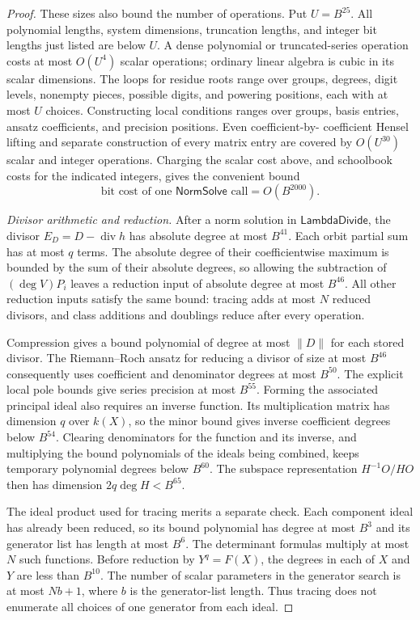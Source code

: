 \begin{proof}
These sizes also bound the number of operations.  Put $U=B^{25}$.
All polynomial lengths, system dimensions, truncation lengths, and
integer bit lengths just listed are below $U$.  A dense polynomial or
truncated-series operation costs at most $O(U^4)$ scalar operations;
ordinary linear algebra is cubic in its scalar dimensions.  The loops
for residue roots range over groups, degrees, digit levels, nonempty
pieces, possible digits, and powering positions, each with at most $U$
choices.  Constructing local conditions ranges over groups, basis entries,
ansatz coefficients, and precision positions.  Even coefficient-by-
coefficient Hensel lifting and separate construction of every matrix
entry are covered by $O(U^{30})$ scalar and integer operations.
Charging the scalar cost above, and schoolbook costs for the indicated
integers, gives the convenient bound
\begin{equation}
 \text{bit cost of one }\mathsf{NormSolve}\text{ call}=O(B^{2000}).
 \label{complexity:norm}
\end{equation}

\smallskip
\noindent\emph{Divisor arithmetic and reduction.}
After a norm solution in $\mathsf{LambdaDivide}$, the divisor
$E_D=D-\operatorname{div}h$ has absolute degree at most $B^{41}$.
Each orbit partial sum has at most $q$ terms.  The absolute degree of
their coefficientwise maximum is bounded by the sum of their absolute
degrees, so allowing the subtraction of $(\deg V)P_i$ leaves a reduction
input of absolute degree at most $B^{46}$.
All other reduction inputs satisfy the same bound: tracing adds at most
$N$ reduced divisors, and class additions and doublings reduce after
every operation.

Compression gives a bound polynomial of degree at most $\|D\|$ for
each stored divisor.  The Riemann--Roch ansatz for reducing a divisor
of size at most $B^{46}$ consequently uses coefficient and denominator
degrees at most $B^{50}$.  The explicit local pole bounds give series
precision at most $B^{55}$.  Forming the associated principal ideal
also requires an inverse function.  Its multiplication matrix has
dimension $q$ over $k(X)$, so the minor bound gives inverse coefficient
degrees below $B^{54}$.  Clearing denominators for the function and its
inverse, and multiplying the bound polynomials of the ideals being
combined, keeps temporary polynomial degrees below $B^{60}$.
The subspace representation $H^{-1}O/HO$ then has dimension
$2q\deg H<B^{65}$.

The ideal product used for tracing merits a separate check.  Each
component ideal has already been reduced, so its bound polynomial has
degree at most $B^3$ and its generator list has length at most $B^6$.
The determinant formulas multiply at most $N$ such functions.  Before
reduction by $Y^q=F(X)$, the degrees in each of $X$ and $Y$ are less
than $B^{10}$.  The number of scalar parameters in the generator search
is at most $Nb+1$, where $b$ is the generator-list length.  Thus tracing
does not enumerate all choices of one generator from each ideal.


\end{proof}
